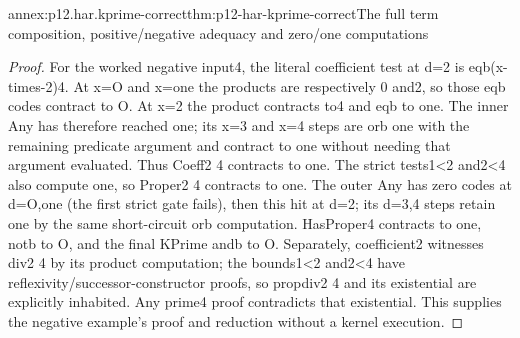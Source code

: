 \begin{annexitem}{annex:p12.har.kprime-correct}{thm:p12-har-kprime-correct}{The full term composition, positive/negative adequacy and zero/one computations}
\begin{proof}
For the worked negative input4, the literal coefficient test at d=2
is eqb(x-times-2)4. At x=O and x=one the products are respectively
0 and2, so those eqb codes contract to O. At x=2 the product
contracts to4 and eqb to one. The inner Any has therefore reached
one; its x=3 and x=4 steps are orb one with the remaining predicate
argument and contract to one without needing that argument evaluated.
Thus Coeff2 4 contracts to one. The strict tests1<2 and2<4 also
compute one, so Proper2 4 contracts to one. The outer Any has zero
codes at d=O,one (the first strict gate fails), then this hit at d=2;
its d=3,4 steps retain one by the same short-circuit orb computation.
HasProper4 contracts to one, notb to O, and the final KPrime andb
to O. Separately, coefficient2 witnesses div2 4 by its product
computation; the bounds1<2 and2<4 have reflexivity/successor-constructor
proofs, so propdiv2 4 and its existential are explicitly inhabited.
Any prime4 proof contradicts that existential. This supplies the
negative example's proof and reduction without a kernel execution.
\end{proof}
\end{annexitem}

